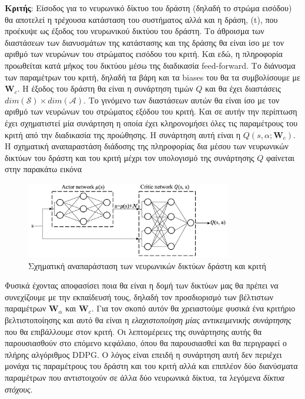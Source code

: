 \documentclass[11pt]{article} %
\numberwithin{equation}{subsection}
\begin{document}
\textbf{Κριτής}: Είσοδος για το νευρωνικό δίκτυο του δράστη (δηλαδή το στρώμα εισόδου) θα αποτελεί η τρέχουσα κατάσταση του συστήματος αλλά και η δράση, \alpha(t), που προέκυψε ως έξοδος του νευρωνικού δικτύου του δράστη. Το άθροισμα των διαστάσεων των διανυσμάτων της κατάστασης και της δράσης θα είναι ίσο με τον αριθμό των νευρώνων του στρώματος εισόδου του κριτή. Και εδώ, η πληροφορία προωθείται κατά μήκος του δικτύου μέσω της διαδικασία feed-forward. Το διάνυσμα των παραμέτρων του κριτή, δηλαδή τα βάρη και τα biases του θα τα συμβολίσουμε με $\textbf{W}_{c}$. Η έξοδος του δράστη θα είναι η συνάρτηση τιμών $Q$ και θα έχει διαστάσεις $dim(\mathcal{S}) \times dim(\mathcal{A})$. Το γινόμενο των διαστάσεων αυτών θα είναι ίσο με τον αριθμό των νευρώνων του στρώματος εξόδου του κριτή. Και σε αυτήν την περίπτωση έχει σχηματιστεί μία συνάρτηση η οποία έχει κληρονομήσει όλες τις παραμέτρους του κριτή από την διαδικασία της προώθησης. Η συνάρτηση αυτή είναι η $Q(s,\alpha; \textbf{W}_{c})$.\\

Η σχηματική αναπαραστάση διάδοσης της πληροφορίας δια μέσου των νευρωνικών δικτύων του δράστη και του κριτή μέχρι τον υπολογισμό της συνάρτησης $Q$ φαίνεται στην παρακάτω εικόνα\\

\begin{figure}[H]
    \centering
    \includegraphics[width=0.8\textwidth]{actor-critic}
    \caption{Σχηματική αναπαράσταση των νευρωνικών δικτύων δράστη και κριτή}
    \label{fig:actor-critic}
\end{figure}

Φυσικά έχοντας αποφασίσει ποια θα είναι η δομή των δικτύων μας θα πρέπει να συνεχίζουμε με την εκπαίδευσή τους, δηλαδή τον προσδιορισμό των βέλτιστων παραμέτρων $\textbf{W}_{α}$ και $\textbf{W}_{c}$. Για τον σκοπό αυτόν θα χρειαστούμε φυσικά ένα κριτήριο βελτιστοποίησης και αυτό θα είναι η \textit{ελαχιστοποίηση μίας αντικειμενικής συνάρτησης} που θα επιβάλλουμε στον κριτή. Οι λεπτομέρειες της συνάρτησης αυτής θα παρουσιασθούν στο επόμενο κεφάλαιο, όπου θα παρουσιασθεί και θα περιγραφεί ο πλήρης αλγόριθμος DDPG. Ο λόγος είναι επειδή η συνάρτηση αυτή δεν περιέχει μονάχα τις παραμέτρους του δράστη και του κριτή αλλά και επιπλέον δύο διανύσματα παραμέτρων που αντιστοιχούν σε άλλα δύο νευρωνικά δίκτυα, τα λεγόμενα \textit{δίκτυα στόχους}.\\
\end{document}
